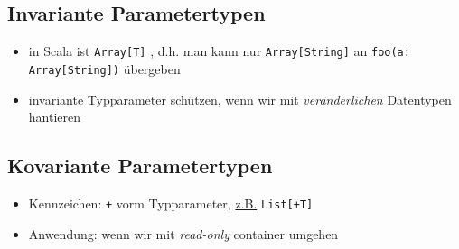 \subsection{Invariante Parametertypen}
\begin{itemize}
  \item in Scala ist \texttt{Array[T]} , d.h. 
  man kann nur \texttt{Array[String]} an \texttt{foo(a: Array[String])}
  übergeben
  \item invariante Typparameter schützen, wenn wir mit
  \textit{veränderlichen} Datentypen hantieren
\end{itemize}


\subsection{Kovariante Parametertypen}
\begin{itemize}
  \item Kennzeichen: \texttt{+} vorm Typparameter, \uline{z.B.} 
  \texttt{List[+T]}
  \item Anwendung: wenn wir mit \textit{read-only} container umgehen
  
  
\end{itemize}



\begin{comment}
\begin{itemize}
  \item http://www.scala-ide.org/ | Plugin für Eclipse
  \item 
  \item n
\end{itemize}
\end{comment}
%
\begin{comment}
\addcontentsline{toc}{section}{Literatur}


\end{comment}

